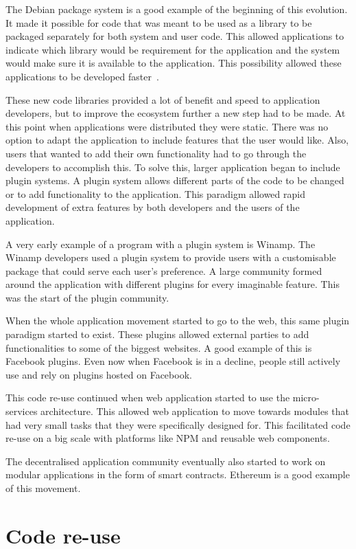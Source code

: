 The Debian package system is a good example of the beginning of this evolution. It made it possible for code that was meant to be used as a library to be packaged separately for both system and user code. This allowed applications to indicate which library would be requirement for the application and the system would make sure it is available to the application. This possibility allowed these applications to be developed faster~\cite{zacchiroli2011debian}.

These new code libraries provided a lot of benefit and speed to application developers, but to improve the ecosystem further a new step had to be made. At this point when applications were distributed they were static. There was no option to adapt the application to include features that the user would like. Also, users that wanted to add their own functionality had to go through the developers to accomplish this. To solve this, larger application began to include plugin systems. A plugin system allows different parts of the code to be changed or to add functionality to the application. This paradigm allowed rapid development of extra features by both developers and the users of the application.

A very early example of a program with a plugin system is Winamp. The Winamp developers used a plugin system to provide users with a customisable package that could serve each user's preference. A large community formed around the application with different plugins for every imaginable feature. This was the start of the plugin community.

When the whole application movement started to go to the web, this same plugin paradigm started to exist. These plugins allowed external parties to add functionalities to some of the biggest websites. A good example of this is Facebook plugins. Even now when Facebook is in a decline, people still actively use and rely on plugins hosted on Facebook.

This code re-use continued when web application started to use the micro-services architecture. This allowed web application to move towards modules that had very small tasks that they were specifically designed for. This facilitated code re-use on a big scale with platforms like NPM and reusable web components.

The decentralised application community eventually also started to work on modular applications in the form of smart contracts. Ethereum is a good example of this movement.

\section{Code re-use}

